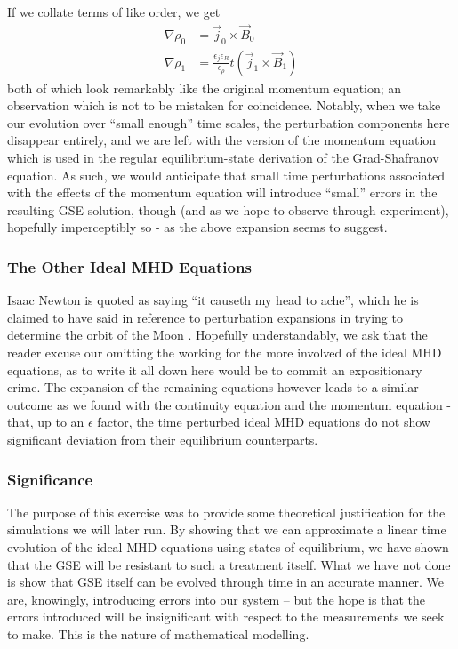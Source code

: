If we collate terms of like order, we get 
\begin{align*}
    \nabla \rho_0 &= \vec{j}_0 \times \vec{B}_0 \\
    \nabla \rho_1 &= \frac{\epsilon_j \epsilon_B}{\epsilon_\rho} t (\vec{j}_1 \times \vec{B}_1) 
\end{align*}
both of which look remarkably like the original momentum equation; an observation which is not to be mistaken for coincidence. Notably, when we take our 
evolution over ``small enough'' time scales, the perturbation components here disappear entirely, and we are left with the version of the 
momentum equation which is used in the regular equilibrium-state derivation of the Grad-Shafranov equation. As such, we would anticipate that 
small time perturbations associated with the effects of the momentum equation will introduce ``small'' errors in the resulting GSE solution, though 
(and as we hope to observe through experiment), hopefully imperceptibly so - as the above expansion seems to suggest.  

\subsubsection{The Other Ideal MHD Equations}
Isaac Newton is quoted as saying ``it causeth my head to ache'', which he is claimed to have said in reference to perturbation expansions 
in trying to determine the orbit of the Moon \cite{newton-headache}. Hopefully understandably, we ask that the reader excuse our omitting the working for the more involved of the ideal MHD equations, 
as to write it all down here would be to commit an expositionary crime. The expansion of the remaining equations however leads to a similar outcome 
as we found with the continuity equation and the momentum equation - that, up to an $\epsilon$ factor, the time perturbed ideal MHD equations do not show significant deviation 
from their equilibrium counterparts. 

\subsubsection{Significance}
The purpose of this exercise was to provide some theoretical justification for the simulations we will later run. By showing that we can 
approximate a linear time evolution of the ideal MHD equations using states of equilibrium, we have shown that the GSE will be resistant 
to such a treatment itself. What we have not done is show that GSE itself can be evolved through time in an accurate manner. We are, knowingly, 
introducing errors into our system -- but the hope is that the errors introduced will be insignificant with respect to the measurements we seek to make. 
This is the nature of mathematical modelling.

